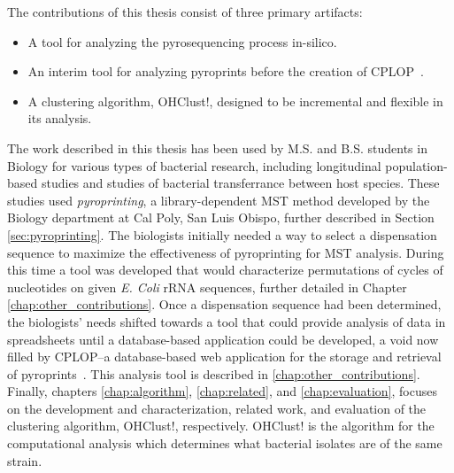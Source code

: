 \documentclass[12pt]{ucthesis}
\begin{document}
   The contributions of this thesis consist of three primary artifacts:
   \begin{itemize}
      \item A tool for analyzing the pyrosequencing process in-silico.
      \item An interim tool for analyzing pyroprints before the creation of
            CPLOP~\cite{Jan:Thesis}.
      \item A clustering algorithm, OHClust!, designed to be incremental and
            flexible in its analysis.
   \end{itemize}
   The work described in this thesis has been used by M.S. and B.S. students in
   Biology for various types of bacterial research, including longitudinal
   population-based studies and studies of bacterial transferrance between host
   species. These studies used \textit{pyroprinting}, a library-dependent MST
   method developed by the Biology department at Cal Poly, San Luis Obispo,
   further described in Section \ref{sec:pyroprinting}. The biologists
   initially needed a way to select a dispensation sequence to maximize the
   effectiveness of pyroprinting for MST analysis. During this time a tool was
   developed that would characterize permutations of cycles of nucleotides on
   given \textit{E. Coli} rRNA sequences, further detailed in Chapter
   \ref{chap:other_contributions}. Once a dispensation sequence had been
   determined, the biologists' needs shifted towards a tool that could provide
   analysis of data in spreadsheets until a database-based application could be
   developed, a void now filled by CPLOP--a database-based web application for
   the storage and retrieval of pyroprints~\cite{Jan:Thesis}. This analysis
   tool is described in \ref{chap:other_contributions}. Finally, chapters
   \ref{chap:algorithm}, \ref{chap:related}, and \ref{chap:evaluation}, focuses
   on the development and characterization, related work, and evaluation of the
   clustering algorithm, OHClust!, respectively. OHClust! is the algorithm
   for the computational analysis which determines what bacterial isolates are
   of the same strain.
\end{document}
